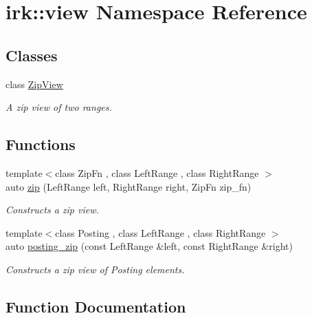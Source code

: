 \hypertarget{namespaceirk_1_1view}{}\section{irk\+:\+:view Namespace Reference}
\label{namespaceirk_1_1view}
\subsection*{Classes}
\begin{DoxyCompactItemize}
\item 
class \mbox{\hyperlink{classirk_1_1view_1_1ZipView}{Zip\+View}}
\begin{DoxyCompactList}\small\item\em A zip view of two ranges. \end{DoxyCompactList}\end{DoxyCompactItemize}
\subsection*{Functions}
\begin{DoxyCompactItemize}
\item 
{\footnotesize template$<$class Zip\+Fn , class Left\+Range , class Right\+Range $>$ }\\auto \mbox{\hyperlink{namespaceirk_1_1view_a1375ca93181b0bcbc509d6b0bf6c5be9}{zip}} (Left\+Range left, Right\+Range right, Zip\+Fn zip\+\_\+fn)
\begin{DoxyCompactList}\small\item\em Constructs a zip view. \end{DoxyCompactList}\item 
{\footnotesize template$<$class Posting , class Left\+Range , class Right\+Range $>$ }\\auto \mbox{\hyperlink{namespaceirk_1_1view_a875b26dd67c40b839be9dacdbbd91bc6}{posting\+\_\+zip}} (const Left\+Range \&left, const Right\+Range \&right)
\begin{DoxyCompactList}\small\item\em Constructs a zip view of Posting elements. \end{DoxyCompactList}\end{DoxyCompactItemize}


\subsection{Function Documentation}
\mbox{\label{namespaceirk_1_1view_a875b26dd67c40b839be9dacdbbd91bc6}} 
